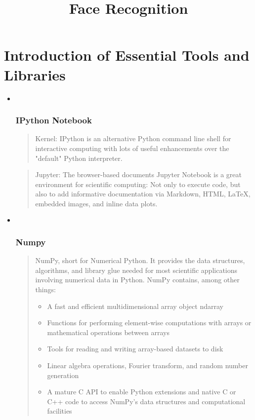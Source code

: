 \documentclass[11pt]{article}
\title{Face Recognition}
\providecommand{\tightlist}{%
      \setlength{\itemsep}{0pt}\setlength{\parskip}{0pt}}
\begin{document}
    
    
    \maketitle
    
    

    
    \section{Introduction of Essential Tools and
Libraries}\label{introduction-of-essential-tools-and-libraries}

\begin{itemize}
\item ~
  \subsubsection{IPython Notebook}\label{ipython-notebook}

  \begin{quote}
  Kernel: IPython is an alternative Python command line shell for
  interactive computing with lots of useful enhancements over the
  "default" Python interpreter.
  \end{quote}

  \begin{quote}
  Jupyter: The browser-based documents Jupyter Notebook is a great
  environment for scientific computing: Not only to execute code, but
  also to add informative documentation via Markdown, HTML, LaTeX,
  embedded images, and inline data plots.
  \end{quote}
\item ~
  \subsubsection{Numpy}\label{numpy}

  \begin{quote}
  NumPy, short for Numerical Python. It provides the data structures,
  algorithms, and library glue needed for most scientific applications
  involving numerical data in Python. NumPy contains, among other
  things:

  \begin{itemize}
  \tightlist
  \item
    A fast and efficient multidimensional array object ndarray
  \item
    Functions for performing element-wise computations with arrays or
    mathematical operations between arrays
  \item
    Tools for reading and writing array-based datasets to disk
  \item
    Linear algebra operations, Fourier transform, and random number
    generation
  \item
    A mature C API to enable Python extensions and native C or C++ code
    to access NumPy's data structures and computational facilities
  \end{itemize}
  \end{quote}


\end{itemize}
\end{document}
